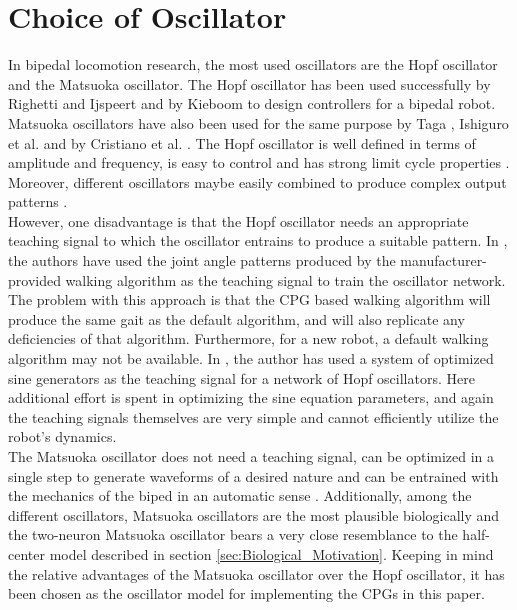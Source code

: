 \documentclass[12pt,twoside]{article}
\theoremstyle{plain}
\theoremstyle{definition}
\theoremstyle{remark}
\newcommand{\forceindent}{\leavevmode{\parindent=2em\indent}}
\begin{document}
\section{Choice of Oscillator}
\label{sec:Choice_of_Oscillator}
In bipedal locomotion research, the most used oscillators are the Hopf oscillator and the Matsuoka oscillator. The Hopf oscillator has been used successfully by Righetti and Ijspeert \cite{Righetti2006} and by Kieboom \cite{Kieboom2009} to design controllers for a bipedal robot. Matsuoka oscillators have also been used for the same purpose by Taga \cite{Taga1991}, Ishiguro et al. \cite{Ishiguro2003} and by Cristiano et al. \cite{cristiano2014locomotion}. The Hopf oscillator is well defined in terms of amplitude and frequency, is easy to control and has strong limit cycle properties \cite{Kieboom2009}. Moreover, different oscillators maybe easily combined to produce complex output patterns \cite{Righetti2006}. \\
\forceindent However, one disadvantage is that the Hopf oscillator needs an appropriate teaching signal to which the oscillator entrains to produce a suitable pattern. In \cite{Righetti2006}, the authors have used the joint angle patterns produced by the manufacturer-provided walking algorithm as the teaching signal to train the oscillator network. The problem with this approach is that the CPG based walking algorithm will produce the same gait as the default algorithm, and will also replicate any deficiencies of that algorithm. Furthermore, for a new robot, a default walking algorithm may not be  available. In \cite{Kieboom2009}, the author has used a system of optimized sine generators as the teaching signal for a network of Hopf oscillators. Here additional effort is spent in optimizing the sine equation parameters, and again the teaching signals themselves are very simple and cannot efficiently utilize the robot's dynamics.\\
\forceindent The Matsuoka oscillator does not need a teaching signal, can be optimized in a single step to generate waveforms of a desired nature and can be entrained with the mechanics of the biped in an automatic sense \cite{Kieboom2009}. Additionally, among the different oscillators, Matsuoka oscillators are the most plausible biologically and the two-neuron Matsuoka oscillator \cite{Matsuoka1987} bears a very close resemblance to the half-center model described in section \ref{sec:Biological_Motivation}. Keeping in mind the relative advantages of the Matsuoka oscillator over the Hopf oscillator, it has been chosen as the oscillator model for implementing the CPGs in this paper.
\end{document}
